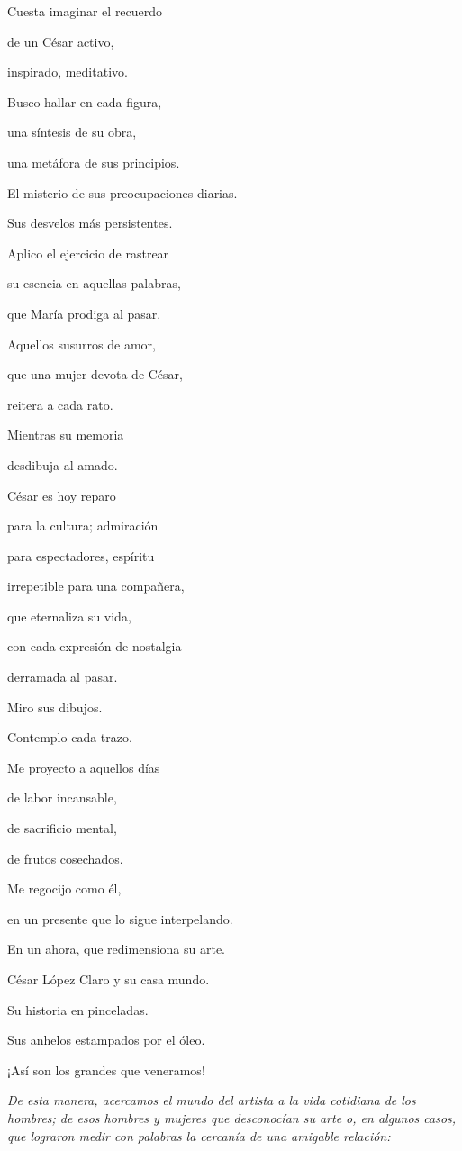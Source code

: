 \documentclass[11pt,twoside,openright,a5paper]{book}
\begin{document}
\begin{center}
Cuesta imaginar el recuerdo 

de un César activo,

inspirado, meditativo.

Busco hallar en cada figura,

una síntesis de su obra,

una metáfora de sus principios.

El misterio de sus preocupaciones diarias.

Sus desvelos más persistentes.

Aplico el ejercicio de rastrear

su esencia en aquellas palabras,

que María prodiga al pasar.

Aquellos susurros de amor, 

que una mujer devota de César,

reitera a cada rato.

Mientras su memoria

desdibuja al amado.

César es hoy reparo 

para la cultura; admiración

para espectadores, espíritu

irrepetible para una compañera,

que eternaliza su vida,

con cada expresión de nostalgia

derramada al pasar.

Miro sus dibujos. 

Contemplo cada trazo.

Me proyecto a aquellos días

de labor incansable,

de sacrificio mental, 

de frutos cosechados.

Me regocijo como él,

en un presente que lo sigue interpelando. 

En un ahora, que redimensiona su arte.

César López Claro y su casa mundo.

Su historia en pinceladas.

Sus anhelos estampados por el óleo.

¡Así son los grandes que veneramos!
\end{center}

\vspace{0.5cm}
\emph{De esta manera, acercamos el mundo del artista a la vida cotidiana de los hombres; de esos hombres y mujeres que desconocían su arte o, en algunos casos, que lograron medir con palabras la cercanía de una amigable relación:}
\end{document}
